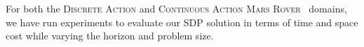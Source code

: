 \documentclass[twoside,11pt]{article}
\newcommand{\MarsRover}{\textsc{Mars Rover }}
\newcommand{\MarsRoverL}{\textsc{Mars Rover Linear }}
\newcommand{\MarsRoverNL}{\textsc{Mars Rover Nonlinear }}
\begin{document}
For both the \textsc{Discrete Action} and \textsc{Continuous Action} \MarsRover\ domains, 
we have run experiments to evaluate our SDP solution 
in terms of time and space cost while varying the horizon and problem size.

\end{document}
